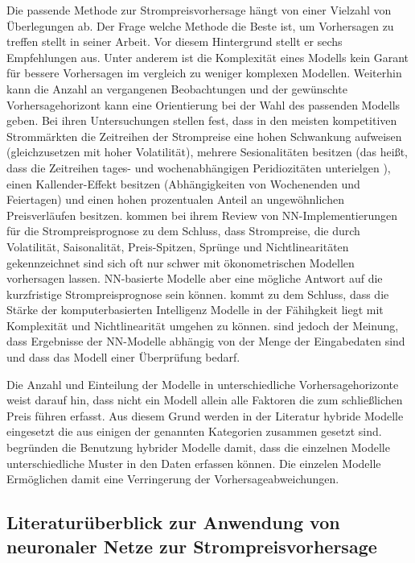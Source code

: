 Die passende Methode zur Strompreisvorhersage hängt von einer Vielzahl von Überlegungen ab. Der Frage welche Methode die Beste ist, um Vorhersagen zu treffen stellt \citet{Chatfield1988} in seiner Arbeit. Vor diesem Hintergrund stellt er sechs Empfehlungen aus. Unter anderem ist die Komplexität eines Modells kein Garant für bessere Vorhersagen im vergleich zu weniger komplexen Modellen. Weiterhin kann die Anzahl an vergangenen Beobachtungen und der gewünschte Vorhersagehorizont kann eine Orientierung bei der Wahl des passenden Modells geben.
Bei ihren Untersuchungen stellen \citet{Nogales2002} fest, dass in den meisten kompetitiven Strommärkten die Zeitreihen der Strompreise eine hohen Schwankung aufweisen (gleichzusetzen mit hoher Volatilität), mehrere Sesionalitäten besitzen (das heißt, dass die Zeitreihen tages- und wochenabhängigen Peridiozitäten unterielgen ), einen Kallender-Effekt besitzen (Abhängigkeiten von Wochenenden und Feiertagen) und einen hohen prozentualen Anteil an ungewöhnlichen Preisverläufen besitzen. \citet{Vijayalakshmi2015} kommen bei ihrem Review von NN-Implementierungen für die Strompreisprognose zu dem Schluss, dass Strompreise, die durch Volatilität, Saisonalität, Preis-Spitzen, Sprünge und Nichtlinearitäten gekennzeichnet sind sich oft nur schwer mit ökonometrischen Modellen vorhersagen lassen. NN-basierte Modelle aber eine mögliche Antwort auf die kurzfristige Strompreisprognose sein können. \citet{Weron2014} kommt zu dem Schluss, dass die Stärke der komputerbasierten Intelligenz Modelle in der Fähihgkeit liegt mit Komplexität und Nichtlinearität umgehen zu können. \citet{Gareta2006} sind jedoch der Meinung, dass Ergebnisse der NN-Modelle abhängig von der Menge der Eingabedaten sind und dass das Modell einer Überprüfung bedarf.

Die Anzahl und Einteilung der Modelle in unterschiedliche Vorhersagehorizonte weist darauf hin, dass nicht ein Modell allein alle Faktoren die zum schließlichen Preis führen erfasst. Aus diesem Grund werden in der Literatur hybride Modelle eingesetzt die aus einigen der genannten Kategorien zusammen gesetzt sind. \citet{Cerjan2013} begründen die Benutzung hybrider Modelle damit, dass die einzelnen Modelle unterschiedliche Muster in den Daten erfassen können. Die einzelen Modelle Ermöglichen damit eine Verringerung der Vorhersageabweichungen.


\subsection{Literaturüberblick zur Anwendung von neuronaler Netze zur Strompreisvorhersage}

